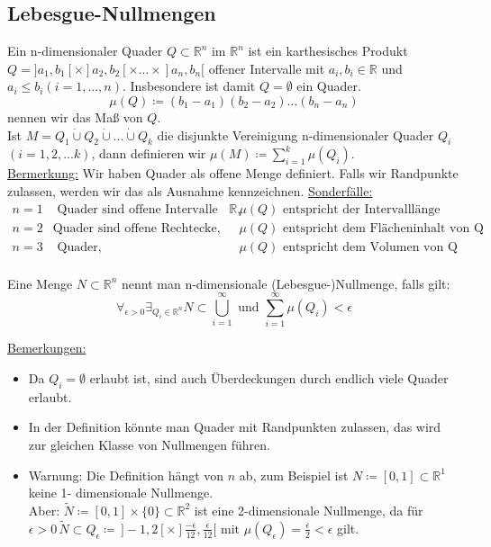 \subsection{Lebesgue-Nullmengen}
Ein n-dimensionaler Quader $Q \subset \mathbb{R}^n$ im $\mathbb{R}^n$ ist ein karthesisches Produkt $Q = ]a_1,b_1[ \times ]a_2,b_2[ \times ... \times ]a_n,b_n[$ offener Intervalle mit $a_i,b_i \in \mathbb{R}$ und $a_i \leq b_i (i=1,...,n)$. Insbesondere ist damit $Q = \emptyset$ ein Quader.
\[ \mu(Q)\coloneqq (b_1 - a_1)(b_2 - a_2)...(b_n - a_n)\] nennen wir das Maß von $Q$.\\
Ist $M = Q_1 \dot\cup Q_2 \dot{\cup} ... \dot{\cup} Q_k$ die disjunkte Vereinigung n-dimensionaler Quader $Q_i$ $(i=1,2,...k)$, dann definieren wir $\mu(M)\coloneqq \sum_{i=1}^{k} \mu(Q_i)$.\\
\underline{Bermerkung:}
Wir haben Quader als offene Menge definiert. Falls wir Randpunkte zulassen, werden wir das als Ausnahme kennzeichnen.
\underline{Sonderfälle:}
\begin{equation*}
	\begin{matrix}
		n=1 &\text{ Quader sind offene Intervalle des } \mathbb{R}, & \mu(Q) \text{ entspricht der Intervalllänge}\\
		n=2 & \text{Quader sind offene Rechtecke, } & \mu(Q) \text{ entspricht dem Flächeninhalt von Q}\\
		n=3 &\text{ Quader, } & \mu(Q) \text{ entspricht dem Volumen von Q}\\
	\end{matrix}
\end{equation*}


\begin{definition}[Nullmenge]
	Eine Menge $N \subset \mathbb{R}^n$ nennt man n-dimensionale (Lebesgue-)Nullmenge, falls gilt:
	\[\forall_{\epsilon > 0} \exists_{Q_i \in \mathbb{R}^n} N \subset \bigcup_{i =1}^{\infty} \text{ und } \sum_{i=1}^{\infty} \mu(Q_i) < \epsilon\]
\end{definition}


\underline{Bemerkungen:}
\begin{itemize}
	\item Da $Q_i = \emptyset$ erlaubt ist, sind auch Überdeckungen durch endlich viele Quader erlaubt.
	\item In der Definition könnte man Quader mit Randpunkten zulassen, das wird zur gleichen Klasse von Nullmengen führen.
	\item Warnung: Die Definition hängt von $n$ ab, zum Beispiel ist $N\coloneqq [0,1] \subset \mathbb{R}^1$ keine 1- dimensionale Nullmenge.\\
	Aber: $\tilde{N}\coloneqq[0,1]\times\{0\}\subset\mathbb{R}^2$ ist eine 2-dimensionale Nullmenge, da für $\epsilon > 0 \, \tilde{N}\subset Q_{\epsilon}\coloneqq\, ]-1,2[ \times ]\frac{-\epsilon}{12}, \frac{\epsilon}{12}[ \text{ mit } \mu(Q_{\epsilon}) = \frac{\epsilon}{2} < \epsilon$ gilt.
\end{itemize}

